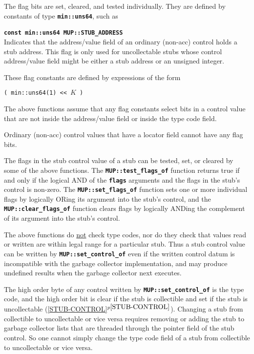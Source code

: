\documentclass[12pt]{article}
\makeatletter
\newcommand{\TT}[1]{{\tt \bfseries #1}}
\newcommand{\ttindex}[1]{\index{#1@{\tt #1}}}
\newcommand{\MUPindex}[1]{\ttindex{MUP::#1}\ttindex{#1}}
\newcommand{\itemref}[1]{\ref{#1}$^{p\pageref{#1}}$}
\newenvironment{indpar}[1][0.3in]%
	{\begin{list}{}%
		     {\setlength{\itemsep}{0in}%
		      \setlength{\topsep}{0in}%
		      \setlength{\parsep}{1ex}%
		      \setlength{\labelwidth}{#1}%
		      \setlength{\leftmargin}{#1}%
		      \addtolength{\leftmargin}{\labelsep}}%
	 \item}%
	{\end{list}}
\newcommand{\LABEL}[1]{\label{#1}}
\newcommand{\MUPKEY}[1]{{\tt \bf #1}\MUPindex{#1}}
\makeatother
\begin{document}
The flag bits are set, cleared, and tested individually.  They are
defined by constants of type \TT{min::uns64}, such as

\begin{indpar}
\begin{list}{}{}
\item[\TT{const min::uns64 MUP::}\MUPKEY{STUB\_ADDRESS}]~%
	\LABEL{MIN::STUB_ADDRESS}\\
Indicates that the address/value field of an ordinary (non-acc)
control holds a stub address.  This flag is only used for
uncollectable stubs whose control address/value field might
be either a stub address or an unsigned integer.
\end{list}
\end{indpar}

These flag constants are defined by expressions of the form

\begin{center}
\verb|( min::uns64(1) << |$K$\verb| )|
\end{center}

The above functions assume that any flag constants select bits
in a control value that are not inside the address/value field
or inside the type code field.

Ordinary (non-acc) control values that have a locator
field cannot have any flag bits.

The flags in the stub control value of a stub can be tested, set, or
cleared by some of the above functions.
The \TT{MUP::test\_flags\_of} function
returns true if and only if the logical AND of the \TT{flags} arguments
and the flags in the stub's control is non-zero.  The \TT{MUP::set\_flags\_of}
function sets one or more individual flags by logically ORing its
argument into the stub's control, and the
\TT{MUP::clear\_flags\_of} function clears flags by logically ANDing
the complement of its argument into the stub's control.

The above functions do \underline{not} check type codes, nor do they check
that values read or written are within legal range for a particular
stub.  Thus a stub control value
can be written by \TT{MUP::set\_control\_of} even if the written
control datum is incompatible with the garbage collector implementation,
and may produce undefined results when the garbage collector
next executes.

The high order byte of any control written by \TT{MUP::set\_control\_of}
is the type code, and the high order bit is clear if the stub is collectible
and set if the stub is uncollectable (\itemref{STUB-CONTROL}).
Changing a stub from collectible to uncollectable or vice versa requires
removing or adding the stub to garbage collector lists that are threaded
through the pointer field of the stub control.  So one cannot simply
change the type code field of a stub from collectible to uncollectable
or vice versa.
\end{document}
